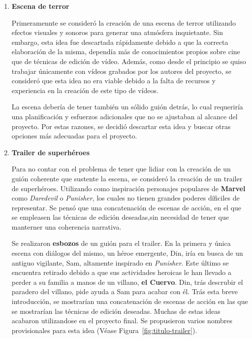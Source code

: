 \begin{enumerate}
    \item \textbf{Escena de terror}
    
    Primeramennte se consideró la creación de una escena de terror utilizando efectos visuales y sonoros para generar una 
    atmósfera inquietante. Sin embargo, esta idea fue descartada rápidamente debido a que la correcta elaboración de la misma, dependía más
    de conocimientos propios sobre cine que de técnicas de edición de vídeo. Además, como desde el principio se quiso trabajar únicamente con
    vídeos grabados por los autores del proyecto, se consideró que esta idea no era viable debido a la falta de recursos y experiencia en la creación
    de este tipo de vídeos.

    La escena debería de tener también un sólido guión detrás, lo cual requeriría una planificación y esfuerzos adicionales que no se
    ajustaban al alcance del proyecto. Por estas razones, se decidió descartar esta idea y buscar otras opciones más adecuadas para el
    proyecto.

    \item \textbf{Trailer de superhéroes}
    
    Para no contar con el problema de tener que lidiar con la creación de un guión coherente que sustente la escena, se consideró la creación
    de un trailer de superhéroes. Utilizando como inspiración personajes populares de \textbf{Marvel} como \textit{Daredevil} o \textit{Punisher},
    los cuales no tienen grandes poderes díficiles de representar. Se pensó que una concatenación de escenas de acción, en el que se
    empleasen las técnicas de edición deseadas,sin necesidad de tener que manterner una coherencia narrativa.

    Se realizaron \textbf{esbozos} de un guión para el trailer. En la primera y única escena con diálogos del mismo, un héroe emergente, Din, iría
    en busca de un antiguo vigilante, Sam, altamente inspirado en \textit{Punisher}. Este último se encuentra retirado debido a que sus actividades
    heroicas le han llevado a perder a su familia a manos de un villano, \textbf{el Cuervo}. Din, trás descrubir el paradero del villano,
    pide ayuda a Sam para acabar con él. Trás esta breve introducción, se mostrarían una concatenación de escenas de acción en las que 
    se mostrarían las técnicas de edición deseadas. Muchas de estas ideas acabaron utilizandose en el proyecto final. Se propusieron
    varios nombres provisionales para esta idea (Véase Figura~\ref{fig:titulo-trailer}).


\end{enumerate}
